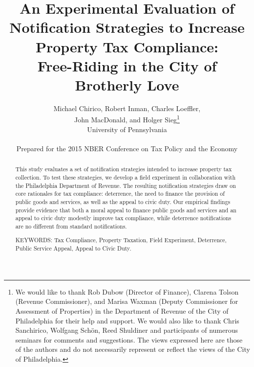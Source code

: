 \documentclass[12pt,titlepage]{article}
\renewcommand{\thefootnote}{\fnsymbol{footnote}}
\begin{document}
\title{An Experimental Evaluation of Notification Strategies to
  Increase Property Tax Compliance: \\ Free-Riding in the City of
  Brotherly Love} \author{Michael Chirico, Robert Inman, Charles
  Loeffler, \\ John MacDonald, and Holger Sieg\thanks{We would like to
    thank Rob Dubow (Director of Finance), Clarena Tolson (Revenue
    Commissioner), and Marisa Waxman (Deputy Commissioner for
    Assessment of Properties) in the Department of Revenue of the City
    of Philadelphia for their help and support. We would also like to
    thank  Chris Sanchirico, Wolfgang Sch\"on, Reed Shuldiner and participants
    of numerous seminars for comments and suggestions. The views
    expressed here are those of the authors and do not necessarily
    represent or reflect the views of the City of Philadelphia.}
  \\ University of Pennsylvania \\ \\ Prepared for the 2015 NBER
  Conference on Tax Policy and the Economy} 
  
  \date{}

\maketitle

\begin{abstract}

This study evaluates a set of notification strategies intended to
increase property tax collection. To test these strategies, we develop
a field experiment in collaboration with the Philadelphia Department
of Revenue.  The resulting notification strategies draw on core rationales for tax compliance:
deterrence, the need to finance the provision of public goods and services, as well as the appeal
to civic duty. Our empirical findings provide evidence that both a moral appeal to
finance public goods and services and an appeal to civic duty modestly improve tax
compliance, while deterrence notifications are no different from standard notifications.

\noindent KEYWORDS: Tax Compliance, Property Taxation, Field
Experiment, Deterrence, Public Service Appeal, Appeal to Civic Duty.

\end{abstract}

\newpage

\renewcommand{\thefootnote}{\arabic{footnote}}
\end{document}
